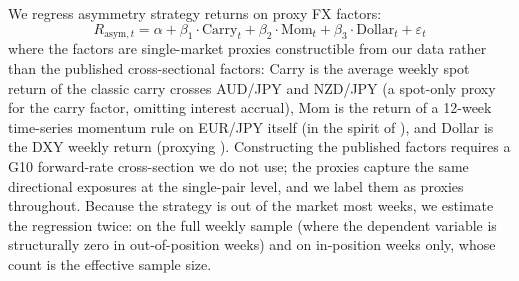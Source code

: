 \documentclass[11pt]{article}
\begin{document}
We regress asymmetry strategy returns on proxy FX factors:
\begin{equation}
    R_{\text{asym},t} = \alpha + \beta_1 \cdot \text{Carry}_t + \beta_2 \cdot \text{Mom}_t + \beta_3 \cdot \text{Dollar}_t + \varepsilon_t
\end{equation}
where the factors are single-market proxies constructible from our data rather than the published cross-sectional factors: Carry is the average weekly spot return of the classic carry crosses AUD/JPY and NZD/JPY (a spot-only proxy for the \citealp{lustig2011common} carry factor, omitting interest accrual), Mom is the return of a 12-week time-series momentum rule on EUR/JPY itself (in the spirit of \citealp{menkhoff2012currency}), and Dollar is the DXY weekly return (proxying \citealp{verdelhan2018dollar}). Constructing the published factors requires a G10 forward-rate cross-section we do not use; the proxies capture the same directional exposures at the single-pair level, and we label them as proxies throughout. Because the strategy is out of the market most weeks, we estimate the regression twice: on the full weekly sample (where the dependent variable is structurally zero in out-of-position weeks) and on in-position weeks only, whose count is the effective sample size.
\end{document}
